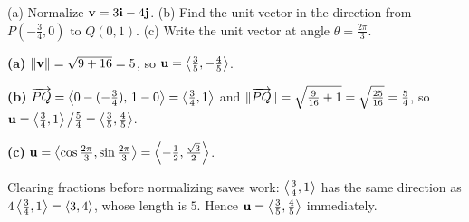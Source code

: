 \begin{example}\label{ex:unit}
(a) Normalize $\mathbf{v}=3\mathbf{i}-4\mathbf{j}$. (b) Find the unit vector in the direction from
$P(-\tfrac34,0)$ to $Q(0,1)$. (c) Write the unit vector at angle
$\theta=\tfrac{2\pi}{3}$.
\end{example}
\begin{solution}
\textbf{(a)} $\lVert\mathbf{v}\rVert=\sqrt{9+16}=5$, so $\mathbf{u}=\left\langle \tfrac35,-\tfrac45 \right\rangle$.

\textbf{(b)} $\overrightarrow{PQ}=\left\langle 0-(-\tfrac34),\,1-0 \right\rangle=\left\langle \tfrac34,1 \right\rangle$ and
$\lVert\overrightarrow{PQ}\rVert=\sqrt{\tfrac{9}{16}+1}=\sqrt{\tfrac{25}{16}}=\tfrac54$, so
$\mathbf{u}=\left\langle \tfrac34,1 \right\rangle\big/\tfrac54=\left\langle \tfrac35,\tfrac45 \right\rangle$.

\textbf{(c)} $\mathbf{u}=\left\langle \cos\tfrac{2\pi}{3},\sin\tfrac{2\pi}{3} \right\rangle=\left\langle -\tfrac12,\tfrac{\sqrt3}{2} \right\rangle$.
\end{solution}

\begin{remark}
Clearing fractions before normalizing saves work: $\left\langle \tfrac34,1 \right\rangle$ has the same
direction as $4\left\langle \tfrac34,1 \right\rangle=\left\langle 3,4 \right\rangle$, whose length is $5$. Hence
$\mathbf{u}=\left\langle \tfrac35,\tfrac45 \right\rangle$ immediately.
\end{remark}
